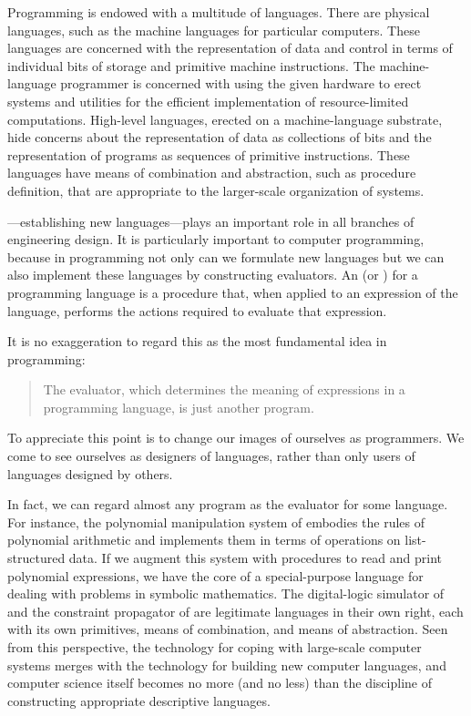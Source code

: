 Programming is endowed with a multitude of languages.
There are physical languages, such as the machine languages for particular computers.
These languages are concerned with the representation of data and control in terms of individual bits of storage and primitive machine instructions.
The machine-language programmer is concerned with using the given hardware to erect systems and utilities for the efficient implementation of resource-limited computations.
High-level languages, erected on a machine-language substrate, hide concerns about the representation of data as collections of bits and the representation of programs as sequences of primitive instructions.
These languages have means of combination and abstraction, such as procedure definition, that are appropriate to the larger-scale organization of systems.

---establishing new languages---plays an important role in all branches of engineering design.
It is particularly important to computer programming, because in programming not only can we formulate new languages but we can also implement these languages by constructing evaluators.
An  (or ) for a programming language is a procedure that, when applied to an expression of the language, performs the actions required to evaluate that expression.

It is no exaggeration to regard this as the most fundamental idea in programming:
\begin{quote}
	The evaluator, which determines the meaning of expressions in a programming language, is just another program.
\end{quote}
To appreciate this point is to change our images of ourselves as programmers.
We come to see ourselves as designers of languages, rather than only users of languages designed by others.

In fact, we can regard almost any program as the evaluator for some language.
For instance, the polynomial manipulation system of  embodies the rules of polynomial arithmetic and implements them in terms of operations on list-structured data.
If we augment this system with procedures to read and print polynomial expressions, we have the core of a special-purpose language for dealing with problems in symbolic mathematics.
The digital-logic simulator of  and the constraint propagator of  are legitimate languages in their own right, each with its own primitives, means of combination, and means of abstraction.
Seen from this perspective, the technology for coping with large-scale computer systems merges with the technology for building new computer languages, and computer science itself becomes no more (and no less) than the discipline of constructing appropriate descriptive languages.

